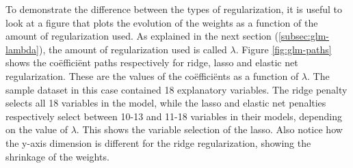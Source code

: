 To demonstrate the difference between the types of regularization, it is useful to look at a figure that plots the evolution of the weights as a function of the amount of regularization used. As explained in the next section (\ref{subsec:glm-lambda}), the amount of regularization used is called $\lambda$. Figure \ref{fig:glm-paths} shows the co\"effici\"ent paths respectively for ridge, lasso and elastic net regularization. These are the values of the co\"effici\"ents as a function of $\lambda$. The sample dataset in this case contained 18 explanatory variables. The ridge penalty selects all 18 variables in the model, while the lasso and elastic net penalties respectively select between 10-13 and 11-18 variables in their models, depending on the value of $\lambda$. This shows the variable selection of the lasso. Also notice how the y-axis dimension is different for the ridge regularization, showing the shrinkage of the weights.

